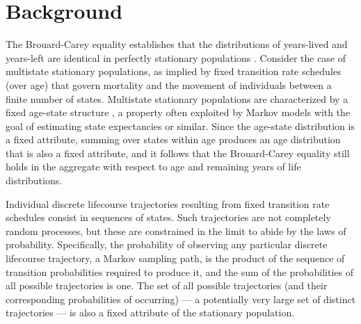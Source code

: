 \documentclass[12pt,oneside,a4paper]{article}
\theoremstyle{definition}
\begin{document}
\section{Background}
The Brouard-Carey equality establishes that the distributions of years-lived and years-left are identical in perfectly stationary populations
\citep{brouard1989mouvements,Vaupel2009,rao2014,villavicencioRiffeSymmetires2016}. Consider the case of multistate stationary populations, as implied by fixed transition rate schedules (over age) that govern mortality and the movement of individuals between a finite number of states. Multistate stationary populations are characterized by a fixed age-state structure \citep{perron1907theorie,frobenius1912matrizen}, a property often exploited by Markov
models with the goal of estimating state expectancies or similar. Since the age-state distribution is a fixed attribute, summing over states within age produces an age distribution that is also a fixed attribute, and it follows that the Brouard-Carey equality still holds in the aggregate with respect to age and remaining years of life distributions. 

Individual discrete lifecourse trajectories resulting from fixed transition rate schedules consist in sequences of states. Such trajectories are not completely random processes, but these are constrained in the limit to abide by the laws of probability. Specifically, the probability of observing any particular discrete lifecourse trajectory, a Markov sampling path, is the product of the sequence of transition probabilities required to produce it, and the sum of the probabilities of all possible trajectories is one. The set of all possible trajectories (and their corresponding probabilities of occurring) --- a potentially very large set of distinct trajectories --- is also a fixed attribute of the stationary population. 
\end{document}
